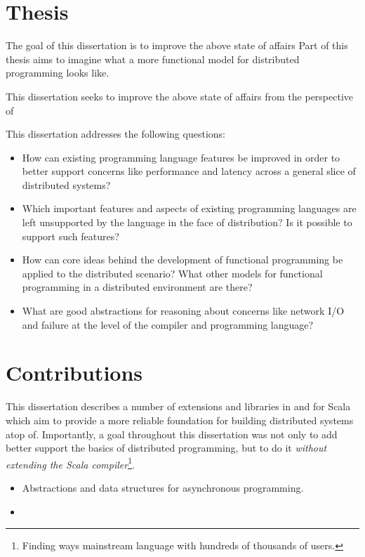 \section{Thesis}

The goal of this dissertation is to improve the above state of affairs
Part of this thesis aims to imagine what a more functional model for distributed programming looks like.

This dissertation seeks to improve the above state of affairs from the
perspective of

This dissertation addresses the following questions:

\begin{itemize}

	\item How can existing programming language features be improved in order to
	better support concerns like performance and latency across a general slice of
	distributed systems?

	\item Which important features and aspects of existing programming languages
	are left unsupported by the language in the face of distribution? Is it
	possible to support such features?

	\item How can core ideas behind the development of functional programming be
	applied to the distributed scenario? What other models for functional
	programming in a distributed environment are there?

	\item What are good abstractions for reasoning about concerns like network I/O
	and failure at the level of the compiler and programming language?

\end{itemize}

\section{Contributions}

This dissertation describes a number of extensions and libraries in and for
Scala which aim to provide a more reliable foundation for building distributed
systems atop of. Importantly, a goal throughout this dissertation was not only
to add better support the basics of distributed programming, but to do it {\em
without extending the Scala compiler}\footnote{Finding ways mainstream language with
hundreds of thousands of users.}.

\begin{itemize}

	\item Abstractions and data structures for asynchronous programming.

	\item

\end{itemize}


